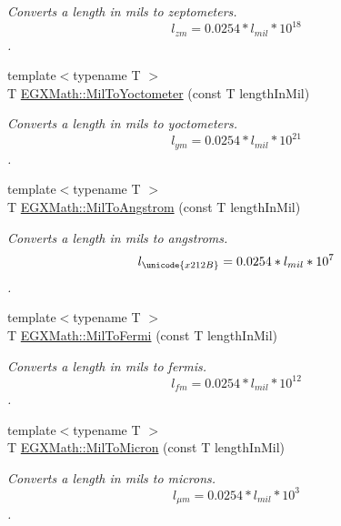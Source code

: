 \begin{DoxyCompactItemize}
\begin{DoxyCompactList}\small\item\em Converts a length in mils to zeptometers. \[ l_{zm}=0.0254 * l_{mil} * 10^{18} \]. \end{DoxyCompactList}\item 
{\footnotesize template$<$typename T $>$ }\\T \mbox{\hyperlink{group___e_g_x_math-_conversions-_length_conversions-_imperial-_mil-_s_i_ga1420821a520a74457ec9d8dfe7ce1678}{E\+G\+X\+Math\+::\+Mil\+To\+Yoctometer}} (const T length\+In\+Mil)
\begin{DoxyCompactList}\small\item\em Converts a length in mils to yoctometers. \[ l_{ym}=0.0254 * l_{mil} * 10^{21} \]. \end{DoxyCompactList}\item 
{\footnotesize template$<$typename T $>$ }\\T \mbox{\hyperlink{group___e_g_x_math-_conversions-_length_conversions-_imperial-_mil-_non-_s_i_gad209d1b047ce810b8879b9ea1ff4a5a5}{E\+G\+X\+Math\+::\+Mil\+To\+Angstrom}} (const T length\+In\+Mil)
\begin{DoxyCompactList}\small\item\em Converts a length in mils to angstroms. \[ l_{\unicode{x212B}}=0.0254 * l_{mil} * 10^{7} \]. \end{DoxyCompactList}\item 
{\footnotesize template$<$typename T $>$ }\\T \mbox{\hyperlink{group___e_g_x_math-_conversions-_length_conversions-_imperial-_mil-_non-_s_i_ga713363db9840eea0ed836b1d47cc0b6c}{E\+G\+X\+Math\+::\+Mil\+To\+Fermi}} (const T length\+In\+Mil)
\begin{DoxyCompactList}\small\item\em Converts a length in mils to fermis. \[ l_{fm}=0.0254 * l_{mil} * 10^{12} \]. \end{DoxyCompactList}\item 
{\footnotesize template$<$typename T $>$ }\\T \mbox{\hyperlink{group___e_g_x_math-_conversions-_length_conversions-_imperial-_mil-_non-_s_i_gab38b772b1b070729756dcdc87826f5d0}{E\+G\+X\+Math\+::\+Mil\+To\+Micron}} (const T length\+In\+Mil)
\begin{DoxyCompactList}\small\item\em Converts a length in mils to microns. \[ l_{\mu m}=0.0254 * l_{mil} * 10^{3} \]. \end{DoxyCompactList}\item 

\end{DoxyCompactItemize}
